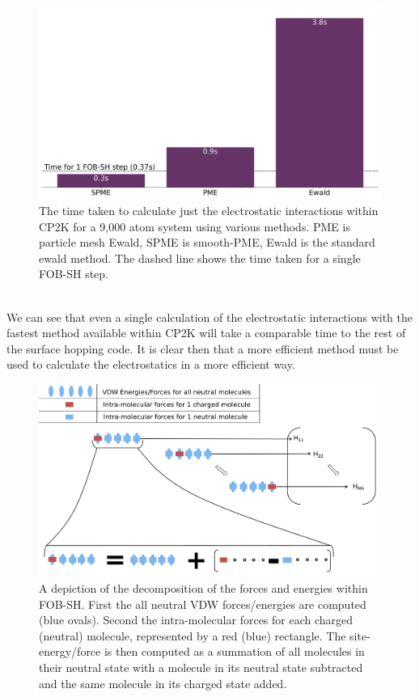 \begin{figure}[ht]
  \includegraphics[width=\textwidth]{./img/ES/InitialTimings.png}
  \caption{\label{fig:ES_Timings}The time taken to calculate just the electrostatic interactions within CP2K for a 9,000 atom system using various methods. PME is particle mesh Ewald, SPME is smooth-PME, Ewald is the standard ewald method. The dashed line shows the time taken for a single FOB-SH step.}
\end{figure}
\\
We can see that even a single calculation of the electrostatic interactions with the fastest method available within CP2K will take a comparable time to the rest of the surface hopping code. It is clear then that a more efficient method must be used to calculate the electrostatics in a more efficient way.
\\
\begin{figure}[ht]
  \includegraphics[width=\textwidth]{./img/ES/ForceEnerDecomp.png}
  \caption{\label{fig:enerF_decomp}A depiction of the decomposition of the forces and energies within FOB-SH. First the all neutral VDW forces/energies are computed (blue ovals). Second the intra-molecular forces for each charged (neutral) molecule, represented by a red (blue) rectangle. The site-energy/force is then computed as a summation of all molecules in their neutral state with a molecule in its neutral state subtracted and the same molecule in its charged state added.} 
\end{figure}
